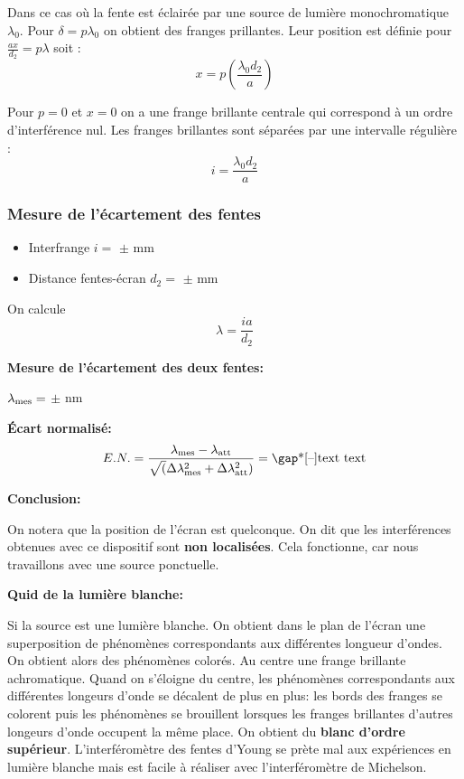\documentclass[french]{article}
\begin{document}
Dans ce cas où la fente est éclairée par une source de lumière monochromatique $\lambda_0$. Pour $\delta = p\lambda_0$ on obtient des franges prillantes. Leur position est définie pour $\frac{ax}{d_2}=p\lambda$ soit : 
$$x = p\left(\frac{\lambda_0d_2}{a}\right)$$

Pour $p=0$ et $x=0$ on a une frange brillante centrale qui correspond à un ordre d'interférence nul. Les franges brillantes sont séparées par une intervalle régulière : 
\begin{equation}
	i = \frac{\lambda_0d_2}{a}
\end{equation}
\subsubsection{Mesure de l'écartement des fentes}
\begin{remarque}
	\begin{itemize}
		\item Interfrange $i = $  $\pm$  mm
		\item Distance fentes-écran $d_2 = $ $\pm$  mm
	\end{itemize}
\end{remarque}

On calcule $$\lambda = \frac{ia}{d_2}$$

\begin{theo}
	\textbf{Mesure de l'écartement des deux fentes:}\gap 

	$\lambda_{\rm mes} = $ $\pm$  nm
\end{theo}

\noindent \textbf{Écart normalisé:}
\[E.N. = \frac{\lambda_{\rm mes}- \lambda_{\rm att}}{\sqrt(\Delta \lambda_{\rm mes}^2+\Delta \lambda_{\rm att}^2 )} = \text{\gap*[--]{text text}}\]


\noindent\textbf{Conclusion:}\gap

On notera que la position de l'écran est quelconque. On dit que les interférences obtenues avec ce dispositif sont  \textbf{non localisées}. Cela fonctionne, car nous travaillons avec une source ponctuelle.\vspace{.5cm}

\noindent\textbf{Quid de la lumière blanche:}\gap 

Si la source est une lumière blanche. On obtient dans le plan de l'écran une superposition de phénomènes correspondants aux différentes longueur d'ondes. On obtient alors des phénomènes colorés. Au centre une frange brillante achromatique. Quand on s'éloigne du centre, les phénomènes correspondants aux différentes longeurs d'onde se décalent de plus en plus: les bords des franges se colorent puis les phénomènes se brouillent lorsques les franges brillantes d'autres longeurs d'onde occupent la même place. On obtient du \textbf{blanc d'ordre supérieur}. L'interféromètre des fentes d'Young se prète mal aux expériences en lumière blanche mais est facile à réaliser avec l'interféromètre de Michelson.
\end{document}
